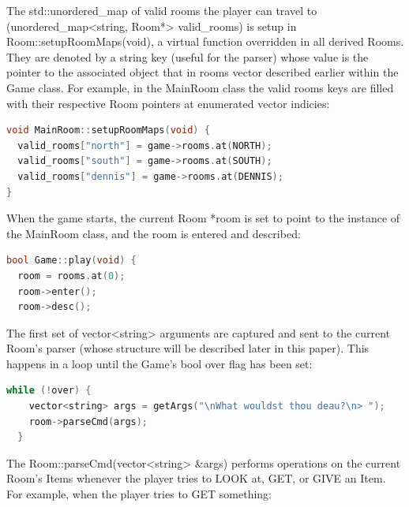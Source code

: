 \documentclass[man,12pt]{apa6}
\begin{document}
The \textsf{std::unordered\_map} of valid rooms the player can travel to
(\textsf{unordered\_map<string, Room*> valid\_rooms}) is setup in
\textsf{Room::setupRoomMaps(void)}, a \textsf{virtual} function overridden in
all derived \textsf{Room}s.  They are denoted by a \textsf{string} key (useful
for the parser) whose value is the pointer to the associated  object
that in \textsf{rooms} vector described earlier within the \textsf{Game} class.
For example, in the \textsf{MainRoom} class the valid rooms keys are filled with
their respective \textsf{Room} pointers at enumerated \textsf{vector} indicies:

\begin{framed}
\begin{lstlisting}[language=C++]
void MainRoom::setupRoomMaps(void) {
  valid_rooms["north"] = game->rooms.at(NORTH);
  valid_rooms["south"] = game->rooms.at(SOUTH);
  valid_rooms["dennis"] = game->rooms.at(DENNIS);
}
\end{lstlisting}
\end{framed}

When the game starts, the current \textsf{Room *room} is set to point to the
instance of the \textsf{MainRoom} class, and the room is \textsf{enter}ed and
\textsf{desc}ribed:

\begin{framed}
\begin{lstlisting}[language=C++]
bool Game::play(void) {
  room = rooms.at(0);
  room->enter();
  room->desc();
\end{lstlisting}
\end{framed}

The first set of \textsf{vector<string>} arguments are captured and sent to the
current \textsf{Room}'s parser (whose structure will be described later in this
paper).  This happens in a loop until the \textsf{Game}'s \textsf{bool over}
flag has been set:
\begin{framed}
\begin{lstlisting}[language=C++]
  while (!over) {
    vector<string> args = getArgs("\nWhat wouldst thou deau?\n> ");
    room->parseCmd(args);
  }
\end{lstlisting}
\end{framed}

The \textsf{Room::parseCmd(vector<string> \&args)} performs operations on the
current \textsf{Room}'s \textsf{Item}s whenever the player tries to
\textsf{LOOK} at, \textsf{GET}, or \textsf{GIVE} an \textsf{Item}.  For example,
when the player tries to \textsf{GET} something:
\end{document}
